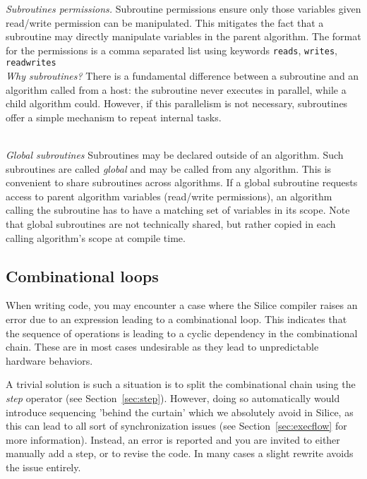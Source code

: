 \documentclass[a4]{article}
\newcommand\silice{Silice}
\begin{document}
\noindent \textit{Subroutines permissions.} Subroutine permissions ensure only those variables given read/write
permission can be manipulated. This mitigates the fact that a subroutine may directly manipulate variables in the 
parent algorithm. The format for the permissions is a comma separated list using keywords \texttt{reads}, \texttt{writes}, \texttt{readwrites} \\

\noindent \textit{Why subroutines?} There is a fundamental difference between a subroutine and an algorithm called from 
a host: the subroutine never executes in parallel, while a child algorithm could. However, if this parallelism is not necessary, 
subroutines offer a simple mechanism to repeat internal tasks.\\~

\noindent \textit{Global subroutines} Subroutines may be declared outside of an algorithm. Such subroutines are called \textit{global} and may be called from any algorithm. This is convenient to share subroutines across algorithms. If a global subroutine requests access to parent algorithm variables (read/write permissions), an algorithm calling the subroutine has to have a matching set of variables in its scope. Note that global subroutines are not technically shared, but rather copied in each calling algorithm's scope at compile time.


\subsection{Combinational loops}

When writing code, you may encounter a case where the \silice{} compiler
raises an error due to an expression leading to a combinational loop. This
indicates that the sequence of operations is leading to a cyclic dependency
in the combinational chain. These are in most
cases undesirable as they lead to unpredictable hardware behaviors.

A trivial solution is such a situation is to split the combinational chain
using the \textit{step} operator (see Section~\ref{sec:step}). However,
doing so automatically would introduce sequencing 'behind the curtain'
which we absolutely avoid in \silice{}, as this can lead to all sort of synchronization issues (see Section~\ref{sec:execflow} for more information). 
Instead, an error is reported and you are invited to either manually add
a step, or to revise the code. In many cases a slight rewrite avoids the
issue entirely.
\end{document}
